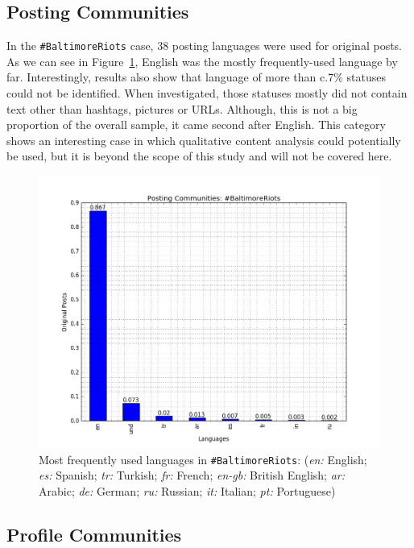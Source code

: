 \subsection{Posting Communities}\label{baltimoreposting}

In the {\texttt{\#BaltimoreRiots}} case, 38 posting languages were
used for original posts. As we can see in
Figure~\ref{fig:baltimore_langfreq}, English was the mostly
frequently-used language by far. Interestingly, results also show that
language of more than c.7\% statuses could not be identified. When
investigated, those statuses mostly did not contain text other than
hashtags, pictures or URLs. Although, this is not a big proportion of
the overall sample, it came second after English. This category shows
an interesting case in which qualitative content analysis could
potentially be used, but it is beyond the scope of this study and will
not be covered here.

\begin{figure}[htb]
\centering
\includegraphics[width=\columnwidth]{images/baltimore_langfreq.png}
\caption{Most frequently used languages in
  {\texttt{\#BaltimoreRiots}}: 
({\emph{en:}} English; {\emph{es:}} Spanish; {\emph{tr:}} Turkish;
  {\emph{fr:}} French; {\emph{en-gb:}} British English; {\emph{ar:}}
  Arabic; {\emph{de:}} German; {\emph{ru:}} Russian; {\emph{it:}}
  Italian; {\emph{pt:}} Portuguese)}
\label{fig:baltimore_langfreq}
\end{figure}

\subsection{Profile Communities}\label{baltimoreprofile}

